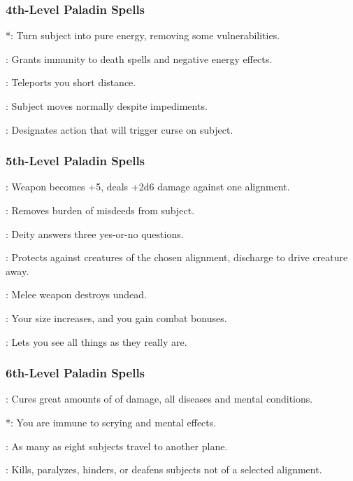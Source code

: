 \subsubsection{4th-Level Paladin Spells}
\begin{list}{}{\leftmargin=1em}
 \item {}*: Turn subject into pure energy, removing some vulnerabilities.
 \item {}: Grants immunity to death spells and negative energy effects.
 \item {}: Teleports you short distance.
 \item {}: Subject moves normally despite impediments.
 \item {}: Designates action that will trigger curse on subject.
\end{list}
\subsubsection{5th-Level Paladin Spells}
\begin{list}{}{\leftmargin=1em}
 \item {}: Weapon becomes +5, deals +2d6 damage against one alignment.
 \item {}: Removes burden of misdeeds from subject.
 \item {}: Deity answers three yes-or-no questions.
 \item {}: Protects against creatures of the chosen alignment, discharge to drive creature away.
 \item {}: Melee weapon destroys undead.
 \item {}: Your size increases, and you gain combat bonuses.
 \item {}: Lets you see all things as they really are.
\end{list}
\subsubsection{6th-Level Paladin Spells}
\begin{list}{}{\leftmargin=1em}
 \item {}: Cures great amounts of of damage, all diseases and mental conditions.
 \item {}*: You are immune to scrying and mental effects.
 \item {}: As many as eight subjects travel to another plane.
 \item {}: Kills, paralyzes, hinders, or deafens subjects not of a selected alignment.
\end{list}
